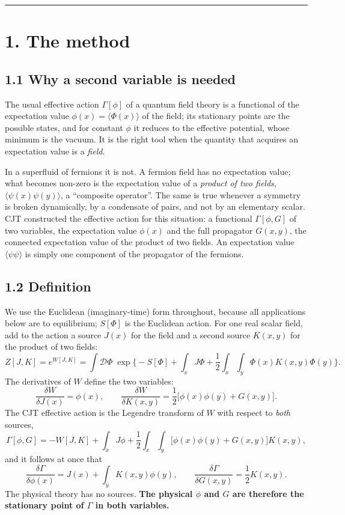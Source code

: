 \documentclass[
  10pt,
]{article}
\begin{document}
\begin{center}\rule{0.5\linewidth}{0.5pt}\end{center}

\hypertarget{the-method}{%
\section{1. The method}\label{the-method}}

\hypertarget{why-a-second-variable-is-needed}{%
\subsection{1.1 Why a second variable is
needed}\label{why-a-second-variable-is-needed}}

The usual effective action \(\Gamma[\phi]\) of a quantum field theory is
a functional of the expectation value \(\phi(x)=\langle\Phi(x)\rangle\)
of the field; its stationary points are the possible states, and for
constant \(\phi\) it reduces to the effective potential, whose minimum
is the vacuum. It is the right tool when the quantity that acquires an
expectation value is a \emph{field}.

In a superfluid of fermions it is not. A fermion field has no
expectation value; what becomes non-zero is the expectation value of a
\emph{product of two fields}, \(\langle\psi(x)\psi(y)\rangle\), a
``composite operator''. The same is true whenever a symmetry is broken
dynamically, by a condensate of pairs, and not by an elementary scalar.
CJT constructed the effective action for this situation: a functional
\(\Gamma[\phi,G]\) of two variables, the expectation value \(\phi(x)\)
and the full propagator \(G(x,y)\), the connected expectation value of
the product of two fields. An expectation value
\(\langle\psi\psi\rangle\) is simply one component of the propagator of
the fermions.

\hypertarget{definition}{%
\subsection{1.2 Definition}\label{definition}}

We use the Euclidean (imaginary-time) form throughout, because all
applications below are to equilibrium; \(S[\Phi]\) is the Euclidean
action. For one real scalar field, add to the action a source \(J(x)\)
for the field and a second source \(K(x,y)\) for the product of two
fields:
\[Z[J,K]=e^{W[J,K]}=\int\!\mathcal D\Phi\;\exp\Big\{-S[\Phi]+\int_x J\Phi+\frac12\int_x\!\int_y\Phi(x)K(x,y)\Phi(y)\Big\}.\tag{1.1}\]
The derivatives of \(W\) define the two variables:
\[\frac{\delta W}{\delta J(x)}=\phi(x),\qquad\frac{\delta W}{\delta K(x,y)}=\frac12\big[\phi(x)\phi(y)+G(x,y)\big].\tag{1.2}\]
The CJT effective action is the Legendre transform of \(W\) with respect
to \emph{both} sources,
\[\Gamma[\phi,G]=-W[J,K]+\int_xJ\phi+\frac12\int_x\!\int_y\big[\phi(x)\phi(y)+G(x,y)\big]K(x,y),\tag{1.3}\]
and it follows at once that
\[\frac{\delta\Gamma}{\delta\phi(x)}=J(x)+\int_yK(x,y)\phi(y),\qquad\frac{\delta\Gamma}{\delta G(x,y)}=\frac12K(x,y).\tag{1.4}\]
The physical theory has no sources. \textbf{The physical \(\phi\) and
\(G\) are therefore the stationary point of \(\Gamma\) in both
variables.}
\end{document}
